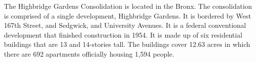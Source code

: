    

    

The Highbridge Gardens Consolidation is located in the Bronx. The consolidation is comprised of a single development, Highbridge Gardens. It is bordered by West 167th Street, and Sedgwick, and University Avenues. It is a federal conventional development that finished construction in 1954. It is made up of six residential buildings that are 13 and 14-stories tall. The buildings cover 12.63 acres in which there are 692 apartments officially housing 1,594 people.     
